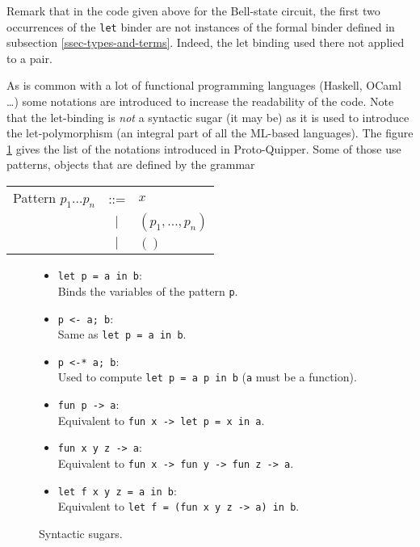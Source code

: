 Remark that in the code given above for the Bell-state circuit, 
the first two occurrences of the \verb#let# binder are not 
instances of the formal binder defined in subsection 
\hyperref[ssec-types-and-terms]{\ref*{ssec-types-and-terms}}. 
Indeed, the let binding used there not applied to a pair. 


As is common with a lot of functional programming languages 
(Haskell, OCaml \ldots) some notations are introduced to increase
the readability of the code. Note that the let-binding is \emph{not} a syntactic sugar (it may be) as it is used to introduce
the let-polymorphism (an integral part of all the ML-based languages).
The figure \ref{sugar} gives the list of the notations introduced in Proto-Quipper. Some of those use patterns, objects that are
defined by the grammar
	\begin{center}
	\begin{tabular}{rcl}
		Pattern $p_1 \dots p_n$ & ::= & $x$ \\
		            & $|$ & $(p_1, \dots, p_n)$ \\
		            & $|$ & $()$
	\end{tabular}
	\end{center}

\begin{figure}[!ht]
\begin{itemize}
\item \verb#let p = a in b#:\\ Binds the variables of the pattern 
  \verb#p#.
\item \verb#p <- a; b#:\\ Same as \verb#let p = a in b#.
\item \verb#p <-* a; b#: \\ Used to compute \verb#let p = a p in b#
                                (\verb#a# must be a function).
\item  \verb#fun p -> a#: \\ Equivalent to
                                \verb#fun x -> let p = x in a#.
\item  \verb#fun x y z -> a#: \\ Equivalent to
                                \verb#fun x -> fun y -> fun z -> a#.
\item  \verb#let f x y z = a in b#: \\ Equivalent to
  \verb#let f = (fun x y z -> a) in b#.
\end{itemize}
\label{sugar}
\caption{Syntactic sugars.}
\end{figure}

